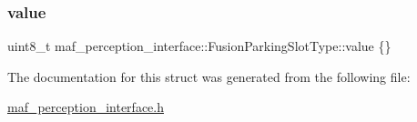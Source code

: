 \subsubsection{\texorpdfstring{value}{value}}
{\footnotesize\ttfamily uint8\+\_\+t maf\+\_\+perception\+\_\+interface\+::\+Fusion\+Parking\+Slot\+Type\+::value \{\}}



The documentation for this struct was generated from the following file\+:\begin{DoxyCompactItemize}
\item 
\hyperlink{maf__perception__interface_8h}{maf\+\_\+perception\+\_\+interface.\+h}\end{DoxyCompactItemize}
